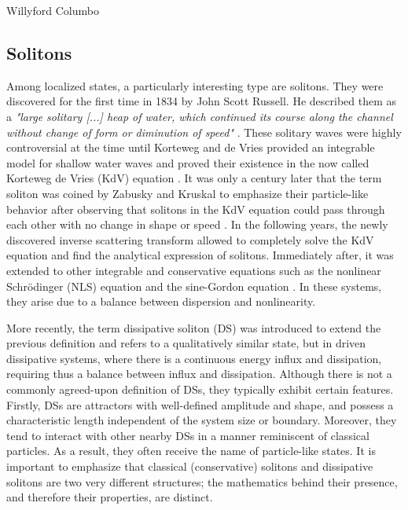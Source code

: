 Willyford Columbo


\subsection{Solitons}

Among localized states, a particularly interesting type are solitons. They were discovered
 for the first time in 1834 by John Scott Russell. He described them 
 as a {\em "large solitary [...] heap of water, which continued its course along the channel without change of form
or diminution of speed"} \cite{russell1845report}. These solitary waves were highly controversial
at the time until Korteweg and de Vries provided an integrable model for shallow water waves
and proved their existence in the now called Korteweg de Vries (KdV) equation \cite{korteweg1895xli}.
It was only a century later that the term soliton was coined by Zabusky and Kruskal
to emphasize their particle-like behavior after observing that solitons in the KdV equation could pass through each
other with no change in shape or speed \cite{zabusky1965interaction}. In the following
years, the newly discovered inverse scattering transform \cite{gardner1967method, gardner1974korteweg}
allowed to completely solve the KdV equation and find the analytical expression of solitons.
Immediately after, it was extended to other integrable and conservative equations such as the nonlinear Schrödinger (NLS)
equation \cite{shabat1972exact} and the sine-Gordon equation \cite{ablowitz1973method}. 
In these systems, they arise due to a balance between dispersion and nonlinearity. 


More recently, the term dissipative soliton (DS) was introduced to extend the previous definition
and refers to a qualitatively
similar state, but in driven dissipative systems, where there is a continuous energy influx and 
dissipation, requiring thus a balance between influx and dissipation. 
Although there is not a commonly agreed-upon definition of DSs, they typically
exhibit certain features. Firstly, DSs are attractors with well-defined amplitude and shape, and
possess a characteristic length independent of the system size or boundary. Moreover, they
tend to interact with other nearby DSs in a manner reminiscent of classical particles. 
As a result, they often receive the name of particle-like states. It is important to emphasize that classical (conservative) solitons and dissipative solitons
are two very different structures; the mathematics behind their presence, and therefore their
properties, are distinct.

